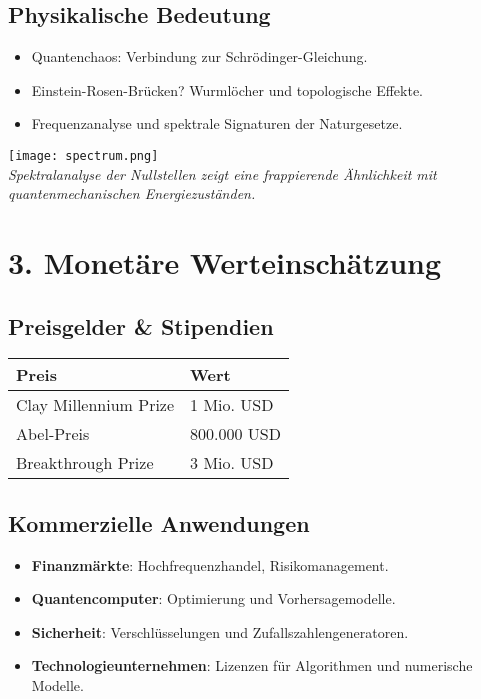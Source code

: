 \documentclass[a4paper,10pt]{article}
\begin{document}
\subsection*{Physikalische Bedeutung}

\begin{itemize}
    \item Quantenchaos: Verbindung zur Schrödinger-Gleichung.
    \item Einstein-Rosen-Brücken? Wurmlöcher und topologische Effekte.
    \item Frequenzanalyse und spektrale Signaturen der Naturgesetze.
\end{itemize}

\begin{center}
    \texttt{[image: spectrum.png]} \\[0.3cm]
    \textit{Spektralanalyse der Nullstellen zeigt eine frappierende Ähnlichkeit mit quantenmechanischen Energiezuständen.}
\end{center}

\vspace{0.3cm}

\section*{3. Monetäre Werteinschätzung}

\subsection*{Preisgelder \& Stipendien}

\begin{tabular}{ll}
    \toprule
    \textbf{Preis} & \textbf{Wert} \\
    \midrule
    Clay Millennium Prize & 1 Mio. USD \\
    Abel-Preis & 800.000 USD \\
    Breakthrough Prize & 3 Mio. USD \\
    \bottomrule
\end{tabular}

\vspace{0.5cm}

\subsection*{Kommerzielle Anwendungen}

\begin{itemize}
    \item \textbf{Finanzmärkte}: Hochfrequenzhandel, Risikomanagement.
    \item \textbf{Quantencomputer}: Optimierung und Vorhersagemodelle.
    \item \textbf{Sicherheit}: Verschlüsselungen und Zufallszahlengeneratoren.
    \item \textbf{Technologieunternehmen}: Lizenzen für Algorithmen und numerische Modelle.
\end{itemize}
\end{document}
